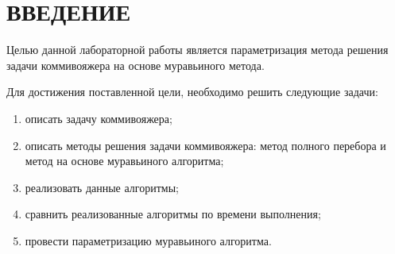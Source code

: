 \chapter*{ВВЕДЕНИЕ}

Целью данной лабораторной работы является параметризация метода решения задачи коммивояжера на основе муравьиного метода.

Для достижения поставленной цели, необходимо решить следующие задачи:
\begin{enumerate}
    \item описать задачу коммивояжера;
    \item описать методы решения задачи коммивояжера: метод полного перебора и метод на основе муравьиного алгоритма;
    \item реализовать данные алгоритмы;
    \item сравнить реализованные алгоритмы по времени выполнения;
    \item провести параметризацию муравьиного алгоритма.
\end{enumerate}